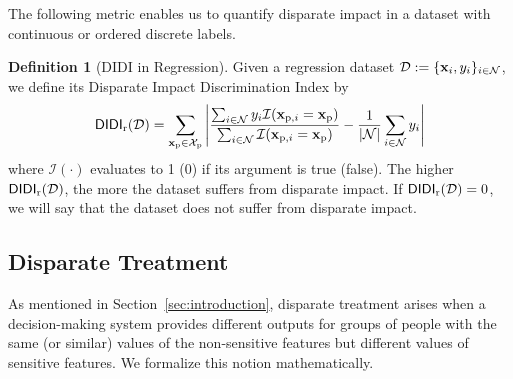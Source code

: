 \documentclass[letterpaper]{article} %
\theoremstyle{definition}
\newtheorem{definition}{Definition}[section]
\newcommand{\1}{\ensuremath{{\rm e}}} %
\newcommand{\prx}{{\bf x}_{\rm p}}
\newcommand{\prxi}{{\bf{x}}_{{\rm{p}},i}}
\newcommand{\prX}{{\mathcal X}_{\rm p}}
\begin{document}
The following metric enables us to quantify disparate impact in a dataset with continuous or ordered discrete labels.
\begin{definition}[DIDI in Regression] Given a regression dataset $\mathcal D:= \{ {\bf x}_i, y_i \}_{i\in \mathcal N}$, we define its Disparate Impact Discrimination Index by
$$
{\mathsf{DIDI}}_{\rm r}({\mathcal D}) = \sum_{\prx \in \prX} \left| 
\frac{  \sum_{ i \in \mathcal N } y_i \mathcal I( \prxi = \prx) }{\sum_{ i \in \mathcal N } \mathcal I( \prxi = \prx) } 
-
\frac{1}{ | \mathcal N | }  \sum_{i \in \mathcal N} y_i
\right|
$$
where $\mathcal I (\cdot)$ evaluates to 1 (0) if its argument is true (false).
%
The higher ${\mathsf{DIDI}}_{\rm r}({\mathcal D})$, the more the dataset suffers from disparate impact. If ${\mathsf{DIDI}}_{\rm r}({\mathcal D}) = 0$, we will say that the dataset does not suffer from disparate impact.
\label{def:DIDIr}
\end{definition}



\subsection{Disparate Treatment}

As mentioned in Section~\ref{sec:introduction}, disparate treatment arises when a decision-making system provides different outputs for groups of people with the same (or similar) values of the non-sensitive features but different values of sensitive features. We formalize this notion mathematically.
\end{document}
